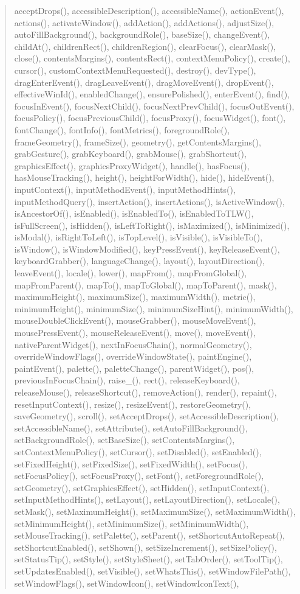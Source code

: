 \begin{quote}
acceptDrops(), accessibleDescription(), accessibleName(), actionEvent(), actions(), activateWindow(), addAction(), addActions(), adjustSize(), autoFillBackground(), backgroundRole(), baseSize(), changeEvent(), childAt(), childrenRect(), childrenRegion(), clearFocus(), clearMask(), close(), contentsMargins(), contentsRect(), contextMenuPolicy(), create(), cursor(), customContextMenuRequested(), destroy(), devType(), dragEnterEvent(), dragLeaveEvent(), dragMoveEvent(), dropEvent(), effectiveWinId(), enabledChange(), ensurePolished(), enterEvent(), find(), focusInEvent(), focusNextChild(), focusNextPrevChild(), focusOutEvent(), focusPolicy(), focusPreviousChild(), focusProxy(), focusWidget(), font(), fontChange(), fontInfo(), fontMetrics(), foregroundRole(), frameGeometry(), frameSize(), geometry(), getContentsMargins(), grabGesture(), grabKeyboard(), grabMouse(), grabShortcut(), graphicsEffect(), graphicsProxyWidget(), handle(), hasFocus(), hasMouseTracking(), height(), heightForWidth(), hide(), hideEvent(), inputContext(), inputMethodEvent(), inputMethodHints(), inputMethodQuery(), insertAction(), insertActions(), isActiveWindow(), isAncestorOf(), isEnabled(), isEnabledTo(), isEnabledToTLW(), isFullScreen(), isHidden(), isLeftToRight(), isMaximized(), isMinimized(), isModal(), isRightToLeft(), isTopLevel(), isVisible(), isVisibleTo(), isWindow(), isWindowModified(), keyPressEvent(), keyReleaseEvent(), keyboardGrabber(), languageChange(), layout(), layoutDirection(), leaveEvent(), locale(), lower(), mapFrom(), mapFromGlobal(), mapFromParent(), mapTo(), mapToGlobal(), mapToParent(), mask(), maximumHeight(), maximumSize(), maximumWidth(), metric(), minimumHeight(), minimumSize(), minimumSizeHint(), minimumWidth(), mouseDoubleClickEvent(), mouseGrabber(), mouseMoveEvent(), mousePressEvent(), mouseReleaseEvent(), move(), moveEvent(), nativeParentWidget(), nextInFocusChain(), normalGeometry(), overrideWindowFlags(), overrideWindowState(), paintEngine(), paintEvent(), palette(), paletteChange(), parentWidget(), pos(), previousInFocusChain(), raise\_(), rect(), releaseKeyboard(), releaseMouse(), releaseShortcut(), removeAction(), render(), repaint(), resetInputContext(), resize(), resizeEvent(), restoreGeometry(), saveGeometry(), scroll(), setAcceptDrops(), setAccessibleDescription(), setAccessibleName(), setAttribute(), setAutoFillBackground(), setBackgroundRole(), setBaseSize(), setContentsMargins(), setContextMenuPolicy(), setCursor(), setDisabled(), setEnabled(), setFixedHeight(), setFixedSize(), setFixedWidth(), setFocus(), setFocusPolicy(), setFocusProxy(), setFont(), setForegroundRole(), setGeometry(), setGraphicsEffect(), setHidden(), setInputContext(), setInputMethodHints(), setLayout(), setLayoutDirection(), setLocale(), setMask(), setMaximumHeight(), setMaximumSize(), setMaximumWidth(), setMinimumHeight(), setMinimumSize(), setMinimumWidth(), setMouseTracking(), setPalette(), setParent(), setShortcutAutoRepeat(), setShortcutEnabled(), setShown(), setSizeIncrement(), setSizePolicy(), setStatusTip(), setStyle(), setStyleSheet(), setTabOrder(), setToolTip(), setUpdatesEnabled(), setVisible(), setWhatsThis(), setWindowFilePath(), setWindowFlags(), setWindowIcon(), setWindowIconText(), 
\end{quote}
